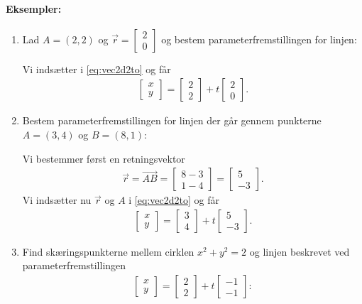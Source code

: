 \paragraph*{Eksempler:}
\begin{enumerate}
\item Lad $A=(2,2)$ og $\vec{r}= \begin{bmatrix}2 \\ 0\end{bmatrix}$ og bestem parameterfremstillingen for linjen:

Vi indsætter i \eqref{eq:vec2d2to} og får
\begin{align*}
\begin{bmatrix}x \\ y\end{bmatrix} = \begin{bmatrix}2 \\2\end{bmatrix}  +t
\begin{bmatrix}2 \\0 \end{bmatrix}.
\end{align*}
\item Bestem parameterfremstillingen for linjen der går gennem punkterne $A=(3,4)$ og $B=(8,1)$:

Vi bestemmer først en retningsvektor 
\begin{align*}
\vec{r}=\overrightarrow{AB} =  \begin{bmatrix}8-3 \\ 1-4\end{bmatrix} =\begin{bmatrix}5 \\ -3\end{bmatrix}.
\end{align*}
Vi indsætter nu $\vec{r}$ og $A$ i \eqref{eq:vec2d2to} og får
\begin{align*}
\begin{bmatrix}x \\ y\end{bmatrix} = \begin{bmatrix}3 \\4\end{bmatrix}  +t
\begin{bmatrix}5 \\-3 \end{bmatrix}.
\end{align*}
\item Find skæringspunkterne mellem cirklen $x^2+y^2=2$ og linjen beskrevet ved parameterfremstillingen
\begin{align*}
\begin{bmatrix}x \\ y\end{bmatrix} = \begin{bmatrix}2 \\2\end{bmatrix}  +t
\begin{bmatrix}-1 \\-1 \end{bmatrix}:
\end{align*}


\end{enumerate}
